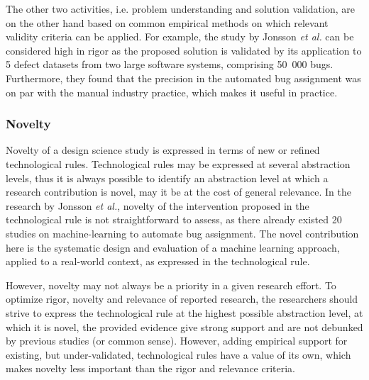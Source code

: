 \documentclass[graybox]{svmult}
\begin{document}
The other two activities, i.e. problem understanding and solution validation, are on the other hand based on common empirical methods on which relevant validity criteria can be applied. For example, the study by Jonsson \emph{et al.} can be considered high in rigor as the proposed solution is validated by its application to 5 defect datasets from two large software systems, comprising 50~000 bugs.  Furthermore, they found that the precision in the automated bug assignment was on par with the manual industry practice, which makes it useful in practice.

\subsubsection{Novelty %
} 
Novelty of a design science study is expressed in terms of new or refined technological rules. Technological rules may be expressed at several abstraction levels, thus it is always possible to identify an abstraction level at which a research contribution is novel, may it be at the cost of general relevance.  In the research by Jonsson \emph{et al.}, novelty of the intervention proposed in the technological rule is not straightforward to assess, as there already existed 20 studies on machine-learning to automate bug assignment. The novel contribution here is the systematic design and evaluation of a machine learning approach, applied to a real-world context, as expressed in the technological rule.

However, novelty may not always be a priority in a given research effort.
To optimize rigor, novelty and relevance of reported research, the researchers should strive to express the technological rule at the highest possible abstraction level, at which it is novel, the provided evidence give strong support and are not debunked by previous studies (or common sense). However, adding empirical support for existing, but under-validated, technological rules have a value of its own, which makes novelty less important than the rigor and relevance criteria.
\end{document}
